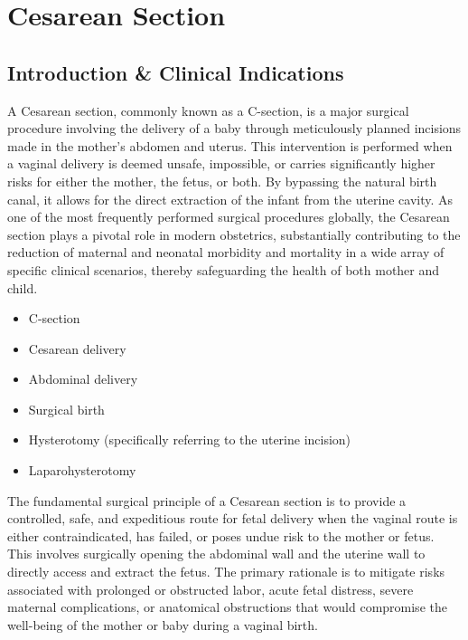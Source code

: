\chapter{Cesarean Section}

\section*{Introduction \& Clinical Indications}
A Cesarean section, commonly known as a C-section, is a major surgical procedure involving the delivery of a baby through meticulously planned incisions made in the mother's abdomen and uterus. This intervention is performed when a vaginal delivery is deemed unsafe, impossible, or carries significantly higher risks for either the mother, the fetus, or both. By bypassing the natural birth canal, it allows for the direct extraction of the infant from the uterine cavity. As one of the most frequently performed surgical procedures globally, the Cesarean section plays a pivotal role in modern obstetrics, substantially contributing to the reduction of maternal and neonatal morbidity and mortality in a wide array of specific clinical scenarios, thereby safeguarding the health of both mother and child.

\begin{itemize}
  \item C-section
  \item Cesarean delivery
  \item Abdominal delivery
  \item Surgical birth
  \item Hysterotomy (specifically referring to the uterine incision)
  \item Laparohysterotomy
\end{itemize}

The fundamental surgical principle of a Cesarean section is to provide a controlled, safe, and expeditious route for fetal delivery when the vaginal route is either contraindicated, has failed, or poses undue risk to the mother or fetus. This involves surgically opening the abdominal wall and the uterine wall to directly access and extract the fetus. The primary rationale is to mitigate risks associated with prolonged or obstructed labor, acute fetal distress, severe maternal complications, or anatomical obstructions that would compromise the well-being of the mother or baby during a vaginal birth.

